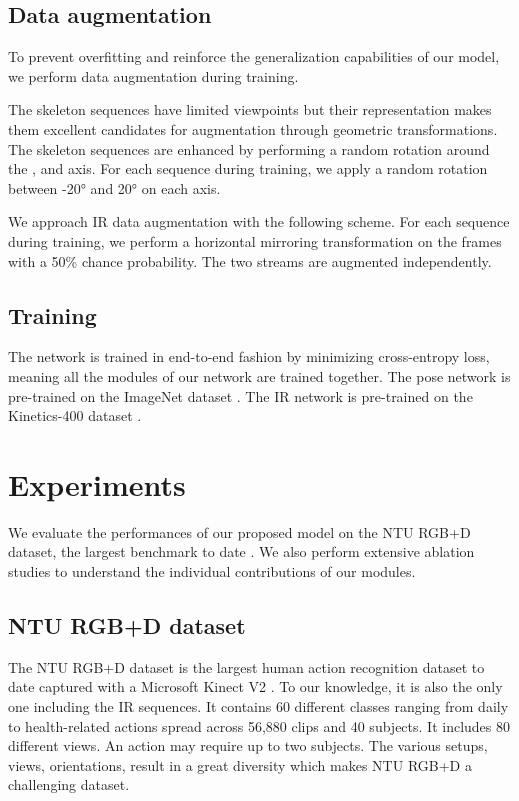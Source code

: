 \documentclass[letterpaper, 10 pt, conference]{ieeeconf}
\begin{document}
\subsection{Data augmentation}

To prevent overfitting and reinforce the generalization capabilities of our model, we perform data augmentation during training. 

The skeleton sequences have limited viewpoints but their representation makes them excellent candidates for augmentation through geometric transformations. The skeleton sequences are enhanced by performing a random rotation around the ,  and  axis. For each sequence during training, we apply a random rotation between \ang{-20} and \ang{20} on each axis. 

We approach IR data augmentation with the following scheme. For each sequence during training, we perform a horizontal mirroring transformation on the frames with a 50\% chance probability. The two streams are augmented independently. 

\subsection{Training}

The network is trained in end-to-end fashion by minimizing cross-entropy loss, meaning all the modules of our network are trained together. The pose network is pre-trained on the ImageNet dataset \cite{deng2009imagenet}. The IR network is pre-trained on the Kinetics-400 dataset \cite{carreira2017quo}. 






\section{Experiments}

We evaluate the performances of our proposed model on the NTU RGB+D dataset, the largest benchmark to date \cite{shahroudy2016ntu}. We also perform extensive ablation studies to understand the individual contributions of our modules.

\subsection{NTU RGB+D dataset}

The NTU RGB+D dataset is the largest human action recognition dataset to date captured with a Microsoft Kinect V2 \cite{zhang2012microsoft}. To our knowledge, it is also the only one including the IR sequences. It contains 60 different classes ranging from daily to health-related actions spread across 56,880 clips and 40 subjects. It includes 80 different views. An action may require up to two subjects. The various setups, views, orientations, result in a great diversity which makes NTU RGB+D a challenging dataset. 
\end{document}

